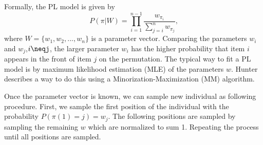 Formally, the PL model is given by
\begin{equation}
    P(\pi|W) = \prod_{i=1}^{n-1}\frac{w_{\pi_i}}{\sum_{j=i}^{n}{w_{\pi_j}}} \text{,}
    \label{eq:pl_mdoel}
\end{equation}
where $W=\lbrace w_1,w_2,...,w_n\rbrace$ is a parameter vector. Comparing the parameters $w_i$ and $w_j$,$i\neqj$, the larger parameter $w_i$ has the higher probability that item $i$ appears in the front of item $j$ on the permutation. The typical way to fit a PL model is by maximum likelihood estimation (MLE) of the parameters $w$. Hunter~\citep{hunter2004mm} describes a way to do this using a Minorization-Maximization (MM) algorithm.

Once the parameter vector \W is known, we can sample new individual as following procedure. First, we sample the first position of the individual with the probability $P(\pi(1)=j)=w_j$. The following positions are sampled by sampling the remaining $w$ which are normalized to sum 1. Repeating the process until all positions are sampled.




